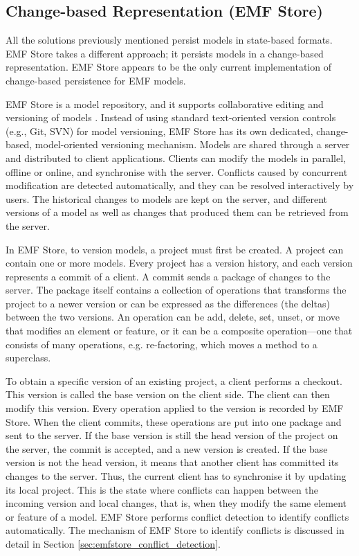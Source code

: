\subsection{Change-based Representation (EMF Store)}
\label{sec:change_based_representation}
All the solutions previously mentioned persist models in state-based formats. EMF Store \cite{koegel2010emfstore} takes a different approach; it persists models in a change-based representation. EMF Store appears to be the only current implementation of change-based persistence for EMF models.

EMF Store is a model repository, and it supports collaborative editing and versioning of models \cite{emfstore2019what}. Instead of using standard text-oriented version controls (e.g., Git, SVN) for model versioning, EMF Store has its own dedicated, change-based, model-oriented versioning mechanism. Models are shared through a server and distributed to client applications. Clients can modify the models in parallel, offline or online, and synchronise with the server. Conflicts caused by concurrent modification are detected automatically, and they can be resolved interactively by users. The historical changes to models are kept on the server, and different versions of a model as well as changes that produced them can be retrieved from the server.

In EMF Store, to version models, a project must first be created. A project can contain one or more models. Every project has a version history, and each version represents a commit of a client. A commit sends a package of changes to the server. The package itself contains a collection of operations that transforms the project to a newer version or can be expressed as the differences (the deltas) between the two versions. An operation can be add, delete, set, unset, or move that modifies an element or feature, or it can be a composite operation—one that consists of many operations, e.g. re-factoring, which moves a method to a superclass.

To obtain a specific version of an existing project, a client performs a checkout. This version is called the base version on the client side. The client can then modify this version. Every operation applied to the version is recorded by EMF Store. When the client commits, these operations are put into one package and sent to the server. If the base version is still the head version of the project on the server, the commit is accepted, and a new version is created. If the base version is not the head version, it means that another client has committed its changes to the server. Thus, the current client has to synchronise it by updating its local project. This is the state where conflicts can happen between the incoming version and local changes, that is, when they modify the same element or feature of a model. EMF Store performs conflict detection to identify conflicts automatically. The mechanism of EMF Store to identify conflicts is discussed in detail in Section \ref{sec:emfstore_conflict_detection}.

